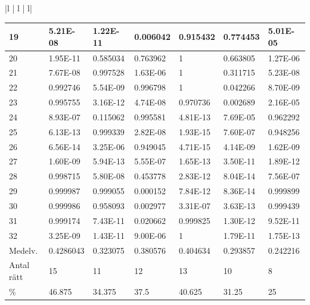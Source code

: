 \documentclass[a4paper,10pt]{article}
\begin{document}
{\begin{tabular}{ |l | l | l| }
\begin{centering}
\begin{centering}
{\begin{tabular}{ |l|l|l|l|l|l|l| }
19	        & 5.21E-08 & 1.22E-11  & 0.006042 &  0.915432 & 0.774453 & 5.01E-05 \\ \hline      
20	        & 1.95E-11 & 0.585034  & 0.763962 &  1        & 0.663805 & 1.27E-06 \\ \hline      
21	        & 7.67E-08 & 0.997528  & 1.63E-06 &  1        & 0.311715 & 5.23E-08 \\ \hline      
22	        & 0.992746 & 5.54E-09  & 0.996798 &  1        & 0.042266 & 8.70E-09 \\ \hline      
23	        & 0.995755 & 3.16E-12  & 4.74E-08 &  0.970736 & 0.002689 & 2.16E-05 \\ \hline      
24	        & 8.93E-07 & 0.115062  & 0.995581 &  4.81E-13 & 7.69E-05 & 0.962292 \\ \hline      
25	        & 6.13E-13 & 0.999339  & 2.82E-08 &  1.93E-15 & 7.60E-07 & 0.948256 \\ \hline      
26	        & 6.56E-14 & 3.25E-06  & 0.949045 &  4.71E-15 & 4.14E-09 & 1.62E-09 \\ \hline      
27	        & 1.60E-09 & 5.94E-13  & 5.55E-07 &  1.65E-13 & 3.50E-11 & 1.89E-12 \\ \hline      
28	        & 0.998715 & 5.80E-08  & 0.453778 &  2.83E-12 & 8.04E-14 & 7.56E-07 \\ \hline      
29	        & 0.999987 & 0.999055  & 0.000152 &  7.84E-12 & 8.36E-14 & 0.999899 \\ \hline      
30	        & 0.999986 & 0.958093  & 0.002977 &  3.31E-07 & 3.63E-13 & 0.999439 \\ \hline      
31	        & 0.999174 & 7.43E-11  & 0.020662 &  0.999825 & 1.30E-12 & 9.52E-11 \\ \hline      
32	        & 3.25E-09 & 1.43E-11  & 9.00E-06 &  1        & 1.79E-11 & 1.75E-13 \\ \hline\hline
Medelv.    & 0.4286043 & 0.323075  & 0.380576 &  0.404634 & 0.293857 & 0.242216 \\ \hline  
Antal rätt & 15        & 11        & 12       & 13        & 10       & 8 \\ \hline
\%		   & 46.875    & 34.375    & 37.5     & 40.625    & 31.25    & 25 \\ \hline
\end{tabular}
}


\end{centering}
\end{centering}
\end{tabular}}
\end{document}

